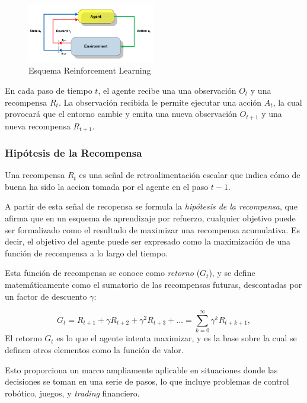 \documentclass[a4paper,12pt, twoside]{report}
\begin{document}
\begin{figure}[H]
    \centering
    \includegraphics[width=0.5\textwidth]{./figures/A-brief-schema-of-Reinforcement-Learning-26.png}
    \caption{Esquema Reinforcement Learning}
    \label{fig:RF-schema}
\end{figure}

En cada paso de tiempo \(t\), el agente recibe una una observación \(O_t\) y una recompensa \(R_t\).
La observación recibida le permite ejecutar una acción \(A_t\), la cual provocará que el entorno cambie
y emita una nueva observación \(O_{t+1}\) y una nueva recompensa \(R_{t+1}\).

\subsubsection{Hipótesis de la Recompensa}

Una recompensa \(R_t\) es una señal de retroalimentación escalar que indica cómo de buena ha sido la accion 
tomada por el agente en el paso \(t-1\). 

A partir de esta señal de recopensa se formula
la \textit{hipótesis de la recompensa}, que afirma que en un esquema de aprendizaje por refuerzo, cualquier 
objetivo puede ser formalizado como el resultado de maximizar una recompensa acumulativa. Es decir, el objetivo del agente puede ser expresado como la maximización de una función de recompensa a lo 
largo del tiempo.

Esta función de recompensa se conoce como \textit{retorno} (\(G_t\)), y se define matemáticamente como el sumatorio
de las recompensas futuras, descontadas por un factor de descuento  \(\gamma\):

\begin{equation}
G_t = R_{t+1} + \gamma R_{t+2} + \gamma^2 R_{t+3} + \dots = \sum_{k=0}^{\infty} \gamma^k R_{t+k+1},
\end{equation}
El retorno \(G_t\) es lo que el agente intenta maximizar, y es la base sobre la cual se definen otros elementos como la función de valor.


Esto proporciona un marco ampliamente aplicable en situaciones donde 
las decisiones se toman en una serie de pasos, lo que incluye problemas de control robótico, juegos, 
y \textit{trading} financiero.
\end{document}
